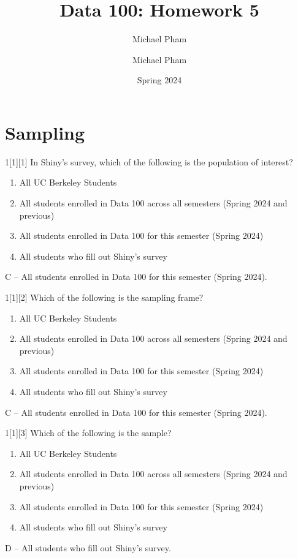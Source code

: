 \documentclass{article}
\title{#1}
\author{Michael Pham}
\date{#2}
\renewcommand{\mytitle}[2]{%
	\title{#1}
	\author{Michael Pham}
	\date{#2}
	\maketitle
	\newpage
	\listoftheorems
	\newpage
}
\begin{document}
\mytitle{Data 100: Homework 5}{Spring 2024}

\section{Sampling}
\begin{dshw}{1}[1][1]
	In Shiny's survey, which of the following is the population of interest?
	\begin{enumerate}[label = \Alph*.]
		\item All UC Berkeley Students
		\item All students enrolled in Data 100 across all semesters (Spring 2024
		and previous)
		\item All students enrolled in Data 100 for this semester (Spring 2024)
		\item All students who fill out Shiny’s survey
	\end{enumerate}
\end{dshw}
\begin{solution}
	C -- All students enrolled in Data 100 for this semester (Spring 2024).
\end{solution}

\begin{dshw}{1}[1][2]
	Which of the following is the sampling frame?
	\begin{enumerate}[label = \Alph*.]
		\item All UC Berkeley Students
		\item All students enrolled in Data 100 across all semesters (Spring 2024
		and previous)
		\item All students enrolled in Data 100 for this semester (Spring 2024)
		\item All students who fill out Shiny’s survey
	\end{enumerate}
\end{dshw}
\begin{solution}
	C -- All students enrolled in Data 100 for this semester (Spring 2024).
\end{solution}

\begin{dshw}{1}[1][3]
	Which of the following is the sample?
	\begin{enumerate}[label = \Alph*.]
		\item All UC Berkeley Students
		\item All students enrolled in Data 100 across all semesters (Spring 2024
		and previous)
		\item All students enrolled in Data 100 for this semester (Spring 2024)
		\item All students who fill out Shiny’s survey
	\end{enumerate}
\end{dshw}
\begin{solution}
	D -- All students who fill out Shiny’s survey.
\end{solution}
\end{document}
